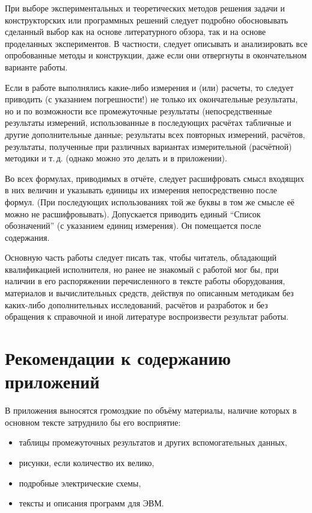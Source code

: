 \documentclass[utf8,12pt, coursreport]{G7-32}
\begin{document}
При выборе экспериментальных и теоретических методов решения задачи и конструкторских или программных решений следует подробно обосновывать сделанный выбор как на основе литературного обзора, так и на основе проделанных экспериментов. В частности, следует описывать и анализировать все опробованные методы и конструкции, даже если они отвергнуты в окончательном варианте работы.

Если в работе выполнялись какие-либо измерения и (или) расчеты, то следует приводить (с указанием погрешности!) не только их окончательные результаты, но и по возможности все промежуточные результаты (непосредственные результаты измерений, использованные в последующих расчётах табличные и другие дополнительные данные; результаты всех повторных измерений, расчётов, результаты, полученные при различных вариантах измерительной (расчётной) методики и т.\,д. (однако можно это делать и в приложении).

Во всех формулах, приводимых в отчёте, следует расшифровать смысл входящих в них величин и указывать единицы их измерения непосредственно после формул. (При последующих использованиях той же буквы в том же смысле её можно не расшифровывать). Допускается приводить единый ``Список обозначений'' (с указанием единиц измерения). Он помещается после содержания.

Основную часть работы следует писать так, чтобы читатель, обладающий квалификацией исполнителя, но ранее не знакомый с работой мог бы, при наличии в его распоряжении перечисленного в тексте работы оборудования, материалов и вычислительных средств, действуя по описанным методикам без каких-либо дополнительных исследований, расчётов и разработок и без обращения к справочной и иной литературе воспроизвести результат работы.

\section{Рекомендации к содержанию приложений}

В приложения выносятся громоздкие по объёму материалы, наличие которых в основном тексте затруднило бы его восприятие:
\begin{itemize}
\item таблицы промежуточных результатов и других вспомогательных данных,
\item рисунки, если количество их велико,
\item подробные электрические схемы,
\item тексты и описания программ для ЭВМ.
\end{itemize}
\end{document}
